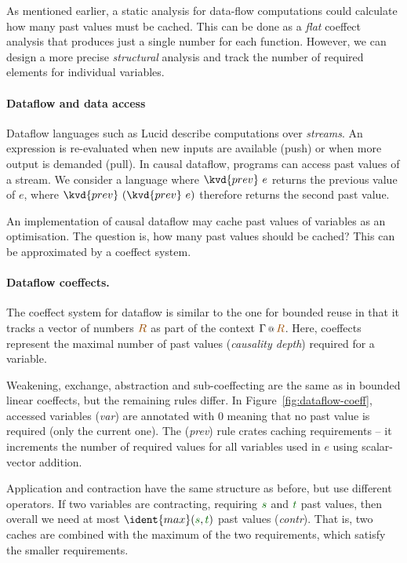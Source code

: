 As mentioned earlier, a static analysis for data-flow computations could calculate how many past 
values must be cached. This can be done as a \emph{flat} coeffect analysis that produces just a 
single number for each function. However, we can design a more precise \emph{structural} analysis
and track the number of required elements for individual variables.


\paragraph{Dataflow and data access}

Dataflow languages such as Lucid \cite{wadge1985lucid} describe computations over \emph{streams}.
An expression is re-evaluated when new inputs are available (push) or when more output
is demanded (pull).  In causal dataflow, programs can access past
values of a stream. We consider a language where $\kvd{prev}~e$
returns the previous value of $e$, where 
$\kvd{prev}~(\kvd{prev}~e)$ therefore returns the second past value.

An implementation of causal dataflow may cache past values of
variables as an optimisation. The question is, how many past values
should be cached?  This can be approximated by a coeffect system.

\paragraph{Dataflow coeffects.} The coeffect system for dataflow is
similar to the one for bounded reuse in that it tracks a vector
of numbers $\aclrd{R}$ as part of the context
$\coctx{\Gamma}{\aclrd{R}}$. Here, coeffects represent the maximal number of
past values (\emph{causality depth}) required for a variable. 

Weakening, exchange, abstraction and sub-coeffecting are the same as in bounded linear
coeffects, but the remaining rules differ. In Figure~\ref{fig:dataflow-coeff},
accessed variables (\emph{var}) are annotated with
$0$ meaning that no past value is required (only the
current one). The (\emph{prev}) rule crates caching requirements --
it increments the number of required values for all variables
used in $e$ using scalar-vector addition.

Application and contraction have the same structure as before, 
but use different operators. If two variables 
are contracting, requiring $\cclrd{s}$ and $\cclrd{t}$ past
values, then overall we need at most
$\ident{max}(\cclrd{s}, \cclrd{t})$ past values (\emph{contr}). That is, 
two caches are combined with the maximum of the two requirements, 
which satisfy the smaller requirements. 


